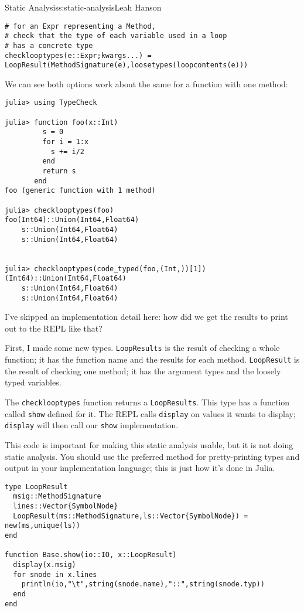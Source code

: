 \begin{aosachapter}{Static Analysis}{s:static-analysis}{Leah Hanson}
\begin{verbatim}
# for an Expr representing a Method,
# check that the type of each variable used in a loop
# has a concrete type
checklooptypes(e::Expr;kwargs...) = LoopResult(MethodSignature(e),loosetypes(loopcontents(e)))
\end{verbatim}

We can see both options work about the same for a function with one
method:

\begin{verbatim}
julia> using TypeCheck

julia> function foo(x::Int)
         s = 0
         for i = 1:x
           s += i/2
         end
         return s
       end
foo (generic function with 1 method)

julia> checklooptypes(foo)
foo(Int64)::Union(Int64,Float64)
    s::Union(Int64,Float64)
    s::Union(Int64,Float64)


julia> checklooptypes(code_typed(foo,(Int,))[1])
(Int64)::Union(Int64,Float64)
    s::Union(Int64,Float64)
    s::Union(Int64,Float64)
\end{verbatim}

\label{pretty-printing}

I've skipped an implementation detail here: how did we get the results
to print out to the REPL like that?

First, I made some new types. \texttt{LoopResults} is the result of
checking a whole function; it has the function name and the results for
each method. \texttt{LoopResult} is the result of checking one method;
it has the argument types and the loosely typed variables.

The \texttt{checklooptypes} function returns a \texttt{LoopResults}.
This type has a function called \texttt{show} defined for it. The REPL
calls \texttt{display} on values it wants to display; \texttt{display}
will then call our \texttt{show} implementation.

This code is important for making this static analysis usable, but it is
not doing static analysis. You should use the preferred method for
pretty-printing types and output in your implementation language; this
is just how it's done in Julia.

\begin{verbatim}
type LoopResult
  msig::MethodSignature
  lines::Vector{SymbolNode}
  LoopResult(ms::MethodSignature,ls::Vector{SymbolNode}) = new(ms,unique(ls))
end

function Base.show(io::IO, x::LoopResult)
  display(x.msig)
  for snode in x.lines
    println(io,"\t",string(snode.name),"::",string(snode.typ))
  end
end


\end{verbatim}
\end{aosachapter}

